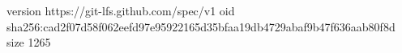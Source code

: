 version https://git-lfs.github.com/spec/v1
oid sha256:cad2f07d58f062eefd97e95922165d35bfaa19db4729abaf9b47f636aab80f8d
size 1265
